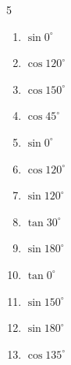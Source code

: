 \begin{multicols}{5}
\begin{enumerate}
  \item $\displaystyle \sin{0^\circ}$

        \phantom{$\displaystyle =0$}

  \item $\displaystyle \cos{120^\circ}$


  \item $\displaystyle \cos{150^\circ}$


  \item $\displaystyle \cos{45^\circ}$


  \item $\displaystyle \sin{0^\circ}$

        \phantom{$\displaystyle =0$}

  \item $\displaystyle \cos{120^\circ}$


  \item $\displaystyle \sin{120^\circ}$


  \item $\displaystyle \tan{30^\circ}$


  \item $\displaystyle \sin{180^\circ}$

        \phantom{$\displaystyle =0$}

  \item $\displaystyle \tan{0^\circ}$

        \phantom{$\displaystyle =0$}

\columnbreak %

  \item $\displaystyle \sin{150^\circ}$


  \item $\displaystyle \sin{180^\circ}$

        \phantom{$\displaystyle =0$}

  \item $\displaystyle \cos{135^\circ}$


\end{enumerate}
\end{multicols}
